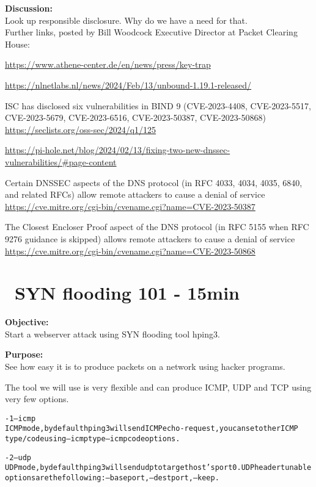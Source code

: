 \documentclass[a4paper,11pt,notitlepage]{report}
\begin{document}
{\bf Discussion:}\\
Look up responsible disclosure. Why do we have a need for that.\\
Further links, posted by Bill Woodcock Executive Director at Packet Clearing House:
\begin{list2}
\item \url{https://www.athene-center.de/en/news/press/key-trap}
\item \url{https://nlnetlabs.nl/news/2024/Feb/13/unbound-1.19.1-released/}
\item ISC has disclosed six vulnerabilities in BIND 9 (CVE-2023-4408, CVE-2023-5517, CVE-2023-5679, CVE-2023-6516, CVE-2023-50387, CVE-2023-50868)\\
\url{https://seclists.org/oss-sec/2024/q1/125}
\item \url{https://pi-hole.net/blog/2024/02/13/fixing-two-new-dnssec-vulnerabilities/#page-content}
\item Certain DNSSEC aspects of the DNS protocol (in RFC 4033, 4034, 4035, 6840, and related RFCs) allow remote attackers to cause a denial of service\\
\url{https://cve.mitre.org/cgi-bin/cvename.cgi?name=CVE-2023-50387}
\item The Closest Encloser Proof aspect of the DNS protocol (in RFC 5155 when RFC 9276 guidance is skipped) allows remote attackers to cause a denial of service\\
\url{https://cve.mitre.org/cgi-bin/cvename.cgi?name=CVE-2023-50868}
\end{list2}


\chapter{\faInfoCircle\ SYN flooding 101 - 15min}
\label{ex:syn-flood-101}

{\bf Objective:}\\
Start a webserver attack using SYN flooding tool hping3.

{\bf Purpose:}\\
See how easy it is to produce packets on a network using hacker programs.

The tool we will use is very flexible and can produce ICMP, UDP and TCP using very few options.

\begin{alltt}\footnotesize
-1 --icmp
       ICMP  mode,  by  default  hping3  will  send  ICMP echo-request, you can set other ICMP
       type/code using --icmptype --icmpcode options.

-2 --udp
       UDP mode, by default hping3 will send udp to target host's port 0.  UDP header  tunable
       options are the following: --baseport, --destport, --keep.
\end{alltt}
\end{document}
